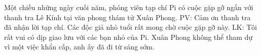 \newpage
\graphicspath{{../suyluancungbi/xuanphong/}}
\begingroup
{} %
\centering
\endgroup
\vspace*{50pt}
%	
%	
%	
	Một chiều những ngày cuối năm, phóng viên tạp chí Pi có cuộc gặp gỡ ngắn với thanh tra Lê Kính tại văn phong thám tử Xuân Phong.
	\vskip 0.1cm
	PV: Cảm ơn thanh tra đã nhận lời tạp chí. Các độc giả nhỏ tuổi rất mong chờ cuộc gặp gỡ này.
	\vskip 0.1cm
	LK: Tôi rất vui có dịp giao lưu với các bạn nhỏ của Pi. Xuân Phong không thể tham dự vì một việc khẩn cấp, anh ấy đã đi từ sáng sớm.

